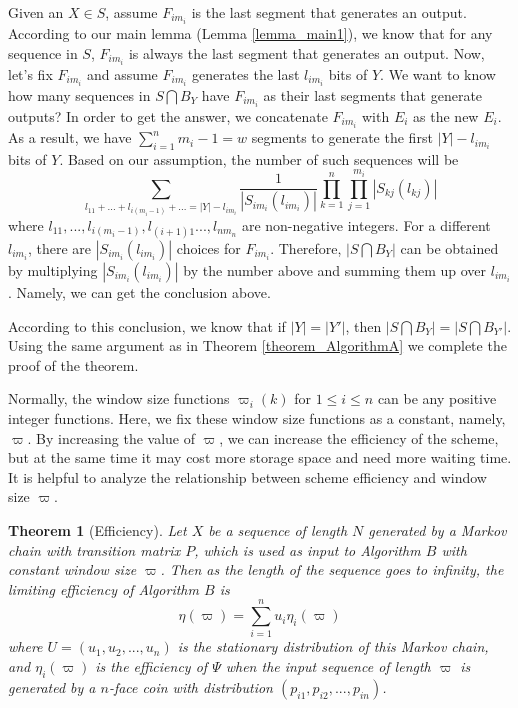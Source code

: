 \documentclass[journal]{IEEEtran}
\newtheorem{Theorem}{Theorem}
\begin{document}
Given an $X\in S$, assume $F_{im_i}$ is the last segment that generates an output. According to our main lemma (Lemma \ref{lemma_main1}), we know that for any sequence in $S$, $F_{im_i}$ is always the last segment that generates an output.
Now, let's fix $F_{im_i}$ and assume $F_{im_i}$ generates the last $l_{im_i}$ bits of $Y$. We want
to know how many sequences in $S\bigcap B_Y$ have $F_{im_i}$ as their last segments that generate outputs?
In order to get the answer, we concatenate $F_{im_i}$ with $E_i$ as the new $E_i$. As a result,
we have $\sum_{i=1}^n m_i-1=w$ segments to generate the first $|Y|-l_{im_i}$ bits of $Y$. Based on our assumption, the number of such sequences will be
$$\sum_{l_{11}+...+l_{i(m_i-1)}+...=|Y|-l_{im_i}}\frac{1}{|S_{im_i}(l_{im_i})|}\prod_{k=1}^n\prod_{j=1}^{m_i}|S_{kj}(l_{kj})|$$
where $l_{11}, ..., l_{i(m_i-1)}, l_{(i+1)1} ..., l_{nm_n}$ are non-negative integers.
For a different $l_{im_i}$, there are $|S_{im_i}(l_{im_i})|$ choices for $F_{im_i}$. Therefore,
$|S\bigcap B_Y|$ can be obtained by multiplying $|S_{im_i}(l_{im_i})|$ by the number above and summing
them up over $l_{im_i}$. Namely, we can get the conclusion above.

According to this conclusion, we know that if $|Y|=|Y'|$, then $|S\bigcap B_Y|=|S\bigcap B_{Y'}|$. Using the same argument as in
Theorem \ref{theorem_AlgorithmA} we complete the proof of the theorem.
\hfill\QED

Normally, the window size functions $\varpi_i(k)$ for $1\leq i\leq n$ can be any positive integer functions. Here,
we fix these window size functions as a constant, namely, $\varpi$. By increasing the value of $\varpi$, we can increase the efficiency of the scheme, but
at the same time it may cost more storage space and need more waiting time. It is helpful to
analyze the relationship between scheme efficiency and window size $\varpi$.

\begin{Theorem}[Efficiency]
Let $X$ be a sequence of length
$N$ generated by a Markov chain with transition matrix $P$, which is used as input
to Algorithm $B$ with constant window size $\varpi$. Then as the length of the sequence goes to infinity,
the limiting efficiency of Algorithm $B$ is
$$\eta(\varpi)=\sum_{i=1}^{n} u_i\eta_{i}(\varpi)$$
where $U=(u_1,u_2,...,u_n)$ is the stationary distribution of this Markov chain, and
$\eta_{i}(\varpi)$ is the efficiency of $\Psi$ when the input sequence of length $\varpi$ is generated
by a $n$-face coin with distribution $(p_{i1},p_{i2},...,p_{in})$.
\end{Theorem}
\end{document}
